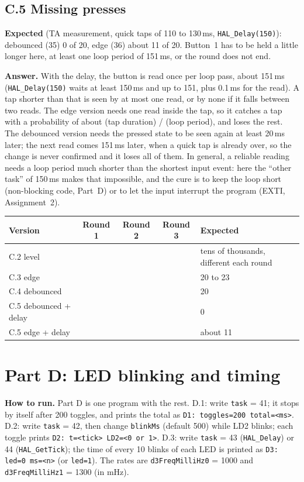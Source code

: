 \documentclass[11pt,a4paper]{article}
\newcommand{\lv}[1]{\texttt{#1}}                 %
\newcommand{\run}[1]{\textbf{How to run.} #1}
\begin{document}
\subsection*{C.5 Missing presses}
\textbf{Expected} (TA measurement, quick taps of 110 to 130\,ms, \texttt{HAL\_Delay(150)}): debounced (35) 0 of 20,
edge (36) about 11 of 20. Button~1 has to be held a little longer here, at least one loop period of 151\,ms, or the
round does not end.

\textbf{Answer.} With the delay, the button is read once per loop pass, about 151\,ms (\texttt{HAL\_Delay(150)} waits
at least 150\,ms and up to 151, plus 0.1\,ms for the read). A tap shorter than that is seen by at most one read, or by
none if it falls between two reads. The edge version needs one read inside the tap, so it catches a tap with a
probability of about (tap duration) / (loop period), and loses the rest. The debounced version needs the pressed state
to be seen again at least 20\,ms later; the next read comes 151\,ms later, when a quick tap is already over, so the
change is never confirmed and it loses all of them. In general, a reliable reading needs a loop period much shorter
than the shortest input event: here the ``other task'' of 150\,ms makes that impossible, and the cure is to keep the
loop short (non-blocking code, Part~D) or to let the input interrupt the program (EXTI, Assignment~2).

\smallskip\noindent
\begin{tabularx}{\textwidth}{@{}l c c c L@{}}
\toprule
Version & Round 1 & Round 2 & Round 3 & Expected \\
\midrule
C.2 level & & & & tens of thousands, different each round \\
C.3 edge & & & & 20 to 23 \\
C.4 debounced & & & & 20 \\
C.5 debounced + delay & & & & 0 \\
C.5 edge + delay & & & & about 11 \\
\bottomrule
\end{tabularx}

\section{Part D: LED blinking and timing}
\run{Part D is one program with the rest. D.1: write \lv{task} = 41; it
stops by itself after 200 toggles, and prints the total as \texttt{D1: toggles=200 total=<ms>}. D.2: write \lv{task} = 42, then change
\lv{blinkMs} (default 500) while LD2 blinks; each toggle prints \texttt{D2: t=<tick> LD2=<0 or 1>}. D.3: write \lv{task} = 43 (\texttt{HAL\_Delay}) or 44
(\texttt{HAL\_GetTick}); the time of every 10 blinks of each LED is printed as \texttt{D3: led=0 ms=<n>} (or \texttt{led=1}). The rates are \lv{d3FreqMilliHz0} = 1000 and \lv{d3FreqMilliHz1} = 1300 (in mHz).}
\end{document}

